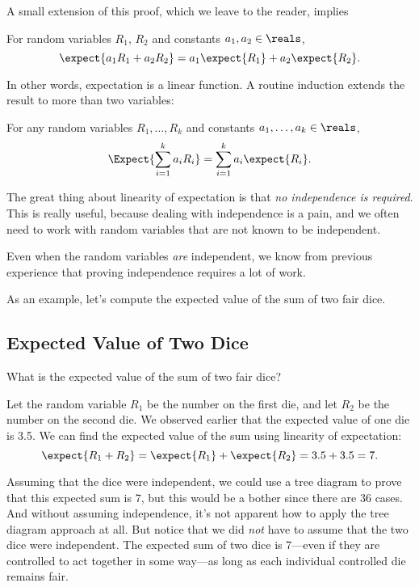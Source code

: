 A small extension of this proof, which we leave to the reader, implies
\begin{theorem}
For random variables $R_1$, $R_2$ and constants $a_1,a_2 \in \reals$,
\[
\expect{a_1R_1 + a_2R_2} = a_1\expect{R_1} + a_2\expect{R_2}.
\]
\end{theorem}
In other words, expectation is a linear function.  A routine induction
extends the result to more than two variables:
\begin{corollary}\label{linexp-k-thm}
For any random variables $R_1, \dots, R_k$ and constants $a_1, \dots, a_k
\in \reals$,
\[
\Expect{\sum_{i=1}^k a_iR_i} = \sum_{i=1}^k a_i\expect{R_i}.
\]
\end{corollary}

The great thing about linearity of expectation is that \emph{no
independence is required}.  This is really useful, because dealing with
independence is a pain, and we often need to work with random variables
that are not known to be independent.

\begin{editingnotes}
Even when the random variables \emph{are} independent, we know
from previous experience that proving independence requires a lot of
work.
\end{editingnotes}

As an example, let's compute the expected value of the sum of two fair
dice.

\subsection{Expected Value of Two Dice}

What is the expected value of the sum of two fair dice?

Let the random variable $R_1$ be the number on the first die, and let
$R_2$ be the number on the second die.  We observed earlier that the
expected value of one die is 3.5.  We can find the expected value of the
sum using linearity of expectation:
\begin{equation*}
\expect{R_1 + R_2} 
 =   \expect{R_1} + \expect{R_2}
 =    3.5 + 3.5
 =    7.
\end{equation*}

Assuming that the dice were independent, we could use a tree diagram
to prove that this expected sum is 7, but this would be a bother since
there are 36 cases.  And without assuming independence, it's not
apparent how to apply the tree diagram approach at all.  But notice
that we did \emph{not} have to assume that the two dice were
independent.  The expected sum of two dice is 7---even if they are
controlled to act together in some way---as long as each individual
controlled die remains fair.

